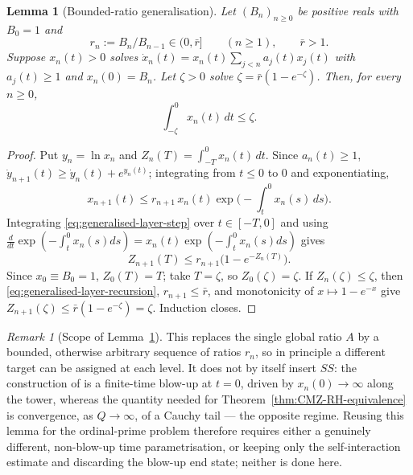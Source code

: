 \documentclass[11pt]{amsart}
\numberwithin{equation}{section}
\theoremstyle{plain}
\newtheorem{lemma}[theorem]{Lemma}
\theoremstyle{definition}
\theoremstyle{remark}
\newtheorem{remark}[theorem]{Remark}
\begin{document}
\begin{lemma}[Bounded-ratio generalisation]
\label{lem:generalised-layer-bound}
Let $(B_n)_{n\ge0}$ be positive reals with $B_0=1$ and
\begin{equation}
r_n:=B_n/B_{n-1}\in(0,\bar r]\qquad(n\ge1),\qquad\bar r>1.
\label{eq:ratio-range}
\end{equation}
Suppose $x_n(t)>0$ solves $\dot x_n(t)=x_n(t)\sum_{j<n}a_j(t)x_j(t)$ with
$a_j(t)\ge1$ and $x_n(0)=B_n$.  Let $\zeta>0$ solve $\zeta=\bar r(1-e^{-\zeta})$.
Then, for every $n\ge0$,
\begin{equation}
\int_{-\zeta}^0x_n(t)\,dt\le\zeta.
\label{eq:generalised-layer-bound}
\end{equation}
\end{lemma}

\begin{proof}
Put $y_n=\ln x_n$ and $Z_n(T)=\int_{-T}^0x_n(t)\,dt$.  Since $a_n(t)\ge1$,
$\dot y_{n+1}(t)\ge\dot y_n(t)+e^{y_n(t)}$; integrating from $t\le0$ to $0$
and exponentiating,
\begin{equation}
x_{n+1}(t)\le r_{n+1}\,x_n(t)\exp\Big(-\int_t^0x_n(s)\,ds\Big).
\label{eq:generalised-layer-step}
\end{equation}
Integrating \eqref{eq:generalised-layer-step} over $t\in[-T,0]$ and using
$\frac{d}{dt}\exp(-\int_t^0x_n(s)ds)=x_n(t)\exp(-\int_t^0x_n(s)ds)$ gives
\begin{equation}
Z_{n+1}(T)\le r_{n+1}\big(1-e^{-Z_n(T)}\big).
\label{eq:generalised-layer-recursion}
\end{equation}
Since $x_0\equiv B_0=1$, $Z_0(T)=T$; take $T=\zeta$, so $Z_0(\zeta)=\zeta$.
If $Z_n(\zeta)\le\zeta$, then \eqref{eq:generalised-layer-recursion},
$r_{n+1}\le\bar r$, and monotonicity of $x\mapsto1-e^{-x}$ give
$Z_{n+1}(\zeta)\le\bar r(1-e^{-\zeta})=\zeta$.  Induction closes.
\end{proof}

\begin{remark}[Scope of Lemma~\ref{lem:generalised-layer-bound}]
\label{rem:generalised-layer-scope}
This replaces the single global ratio $A$ by a bounded, otherwise arbitrary
sequence of ratios $r_n$, so in principle a different target can be assigned
at each level.  It does not by itself insert $SS$: the construction of
\cite{CordobaMartinezZoroaZheng2023} is a finite-time blow-up at $t=0$,
driven by $x_n(0)\to\infty$ along the tower, whereas the quantity needed for
Theorem~\ref{thm:CMZ-RH-equivalence} is convergence, as $Q\to\infty$, of a
Cauchy tail --- the opposite regime.  Reusing this lemma for the
ordinal-prime problem therefore requires either a genuinely different,
non-blow-up time parametrisation, or keeping only the self-interaction
estimate and discarding the blow-up end state; neither is done here.
\end{remark}
\end{document}

